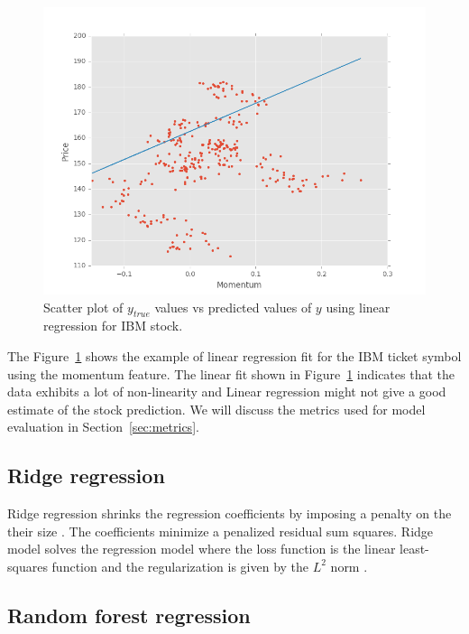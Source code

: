 \documentclass[12pt]{article}
\begin{document}
\begin{itemize}
\begin{figure}[!htbp]
\begin{center}
\includegraphics[height=0.4\textheight,width=\textwidth]{lr_momentum_fit.png}
\caption{Scatter plot of $y_{true}$ values vs predicted values of $y$ using linear regression for IBM stock. }
\label{fig:lr_example}
\end{center}
\end{figure}

The Figure~\ref{fig:lr_example} shows the example of linear regression fit for the IBM ticket symbol using the momentum feature. The linear fit shown in Figure~\ref{fig:lr_example} indicates that the data exhibits a lot of non-linearity and Linear regression might not give a good estimate of the  stock prediction. We will discuss the metrics used for model evaluation in Section~\ref{sec:metrics}.

\subsection{Ridge regression}
\label{sec:rr}
Ridge regression shrinks the regression coefficients by imposing a penalty on the their size \cite{ESL2}. The coefficients minimize a penalized residual sum squares.  
Ridge model solves the regression model where the loss function is the linear least-squares function and the regularization is given by the $L^2$ norm \cite{scikit-ridge}.

\subsection{Random forest regression}
\label{sec:rfr}


\end{itemize}
\end{document}
